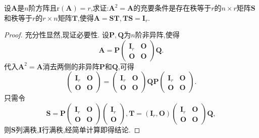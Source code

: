\documentclass[../../main.tex]{subfiles}%
\begin{document}
\begin{proposition}[幂等矩阵关于满秩分解的刻画]\label{proposition:幂等矩阵关于满秩分解的刻画}
设\(\boldsymbol{A}\)是\(n\)阶方阵且\(\mathrm{r}(\boldsymbol{A}) = r\),求证:\(\boldsymbol{A}^2=\boldsymbol{A}\)的充要条件是存在秩等于\(r\)的\(n\times r\)矩阵\(\boldsymbol{S}\)和秩等于\(r\)的\(r\times n\)矩阵\(\boldsymbol{T}\),使得\(\boldsymbol{A}=\boldsymbol{S}\boldsymbol{T},\boldsymbol{T}\boldsymbol{S}=\boldsymbol{I}_r\).
\end{proposition}
\begin{proof}

充分性显然,现证必要性. 设\(\boldsymbol{P},\boldsymbol{Q}\)为\(n\)阶非异阵,使得
\[
\boldsymbol{A}=\boldsymbol{P}\begin{pmatrix}
\boldsymbol{I}_r&\boldsymbol{O}\\
\boldsymbol{O}&\boldsymbol{O}
\end{pmatrix}\boldsymbol{Q}.
\]
代入\(\boldsymbol{A}^2=\boldsymbol{A}\)消去两侧的非异阵\(\boldsymbol{P}\)和\(\boldsymbol{Q}\),可得
\[
\begin{pmatrix}
\boldsymbol{I}_r&\boldsymbol{O}\\
\boldsymbol{O}&\boldsymbol{O}
\end{pmatrix}=\begin{pmatrix}
\boldsymbol{I}_r&\boldsymbol{O}\\
\boldsymbol{O}&\boldsymbol{O}
\end{pmatrix}\boldsymbol{Q}\boldsymbol{P}\begin{pmatrix}
\boldsymbol{I}_r&\boldsymbol{O}\\
\boldsymbol{O}&\boldsymbol{O}
\end{pmatrix}.
\]
只需令
\[
\boldsymbol{S}=\boldsymbol{P}\begin{pmatrix}
\boldsymbol{I}_r&\boldsymbol{O}\\
\boldsymbol{O}&\boldsymbol{O}
\end{pmatrix}\begin{pmatrix}
\boldsymbol{I}_r\\
\boldsymbol{O}
\end{pmatrix},\boldsymbol{T}=(\boldsymbol{I}_r,\boldsymbol{O})\begin{pmatrix}
\boldsymbol{I}_r&\boldsymbol{O}\\
\boldsymbol{O}&\boldsymbol{O}
\end{pmatrix}\boldsymbol{Q},
\]
则$\boldsymbol{S}$列满秩,$\boldsymbol{I}$行满秩,经简单计算即得结论.

\end{proof}
\end{document}
